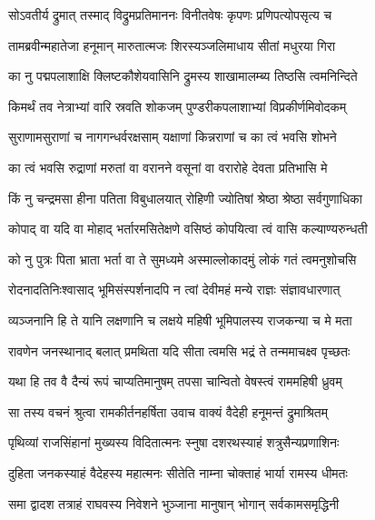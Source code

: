 
\twolineshloka
{सोऽवतीर्य द्रुमात् तस्माद् विद्रुमप्रतिमाननः}
{विनीतवेषः कृपणः प्रणिपत्योपसृत्य च} %

\twolineshloka
{तामब्रवीन्महातेजा हनूमान् मारुतात्मजः}
{शिरस्यञ्जलिमाधाय सीतां मधुरया गिरा} %

\twolineshloka
{का नु पद्मपलाशाक्षि क्लिष्टकौशेयवासिनि}
{द्रुमस्य शाखामालम्ब्य तिष्ठसि त्वमनिन्दिते} %

\twolineshloka
{किमर्थं तव नेत्राभ्यां वारि स्रवति शोकजम्}
{पुण्डरीकपलाशाभ्यां विप्रकीर्णमिवोदकम्} %

\twolineshloka
{सुराणामसुराणां च नागगन्धर्वरक्षसाम्}
{यक्षाणां किन्नराणां च का त्वं भवसि शोभने} %

\twolineshloka
{का त्वं भवसि रुद्राणां मरुतां वा वरानने}
{वसूनां वा वरारोहे देवता प्रतिभासि मे} %

\twolineshloka
{किं नु चन्द्रमसा हीना पतिता विबुधालयात्}
{रोहिणी ज्योतिषां श्रेष्ठा श्रेष्ठा सर्वगुणाधिका} %

\twolineshloka
{कोपाद् वा यदि वा मोहाद् भर्तारमसितेक्षणे}
{वसिष्ठं कोपयित्वा त्वं वासि कल्याण्यरुन्धती} %

\twolineshloka
{को नु पुत्रः पिता भ्राता भर्ता वा ते सुमध्यमे}
{अस्माल्लोकादमुं लोकं गतं त्वमनुशोचसि} %

\twolineshloka
{रोदनादतिनिःश्वासाद् भूमिसंस्पर्शनादपि}
{न त्वां देवीमहं मन्ये राज्ञः संज्ञावधारणात्} %

\twolineshloka
{व्यञ्जनानि हि ते यानि लक्षणानि च लक्षये}
{महिषी भूमिपालस्य राजकन्या च मे मता} %

\twolineshloka
{रावणेन जनस्थानाद् बलात् प्रमथिता यदि}
{सीता त्वमसि भद्रं ते तन्ममाचक्ष्व पृच्छतः} %

\twolineshloka
{यथा हि तव वै दैन्यं रूपं चाप्यतिमानुषम्}
{तपसा चान्वितो वेषस्त्वं राममहिषी ध्रुवम्} %

\twolineshloka
{सा तस्य वचनं श्रुत्वा रामकीर्तनहर्षिता}
{उवाच वाक्यं वैदेही हनूमन्तं द्रुमाश्रितम्} %

\twolineshloka
{पृथिव्यां राजसिंहानां मुख्यस्य विदितात्मनः}
{स्नुषा दशरथस्याहं शत्रुसैन्यप्रणाशिनः} %

\twolineshloka
{दुहिता जनकस्याहं वैदेहस्य महात्मनः}
{सीतेति नाम्ना चोक्ताहं भार्या रामस्य धीमतः} %

\twolineshloka
{समा द्वादश तत्राहं राघवस्य निवेशने}
{भुञ्जाना मानुषान् भोगान् सर्वकामसमृद्धिनी} %

